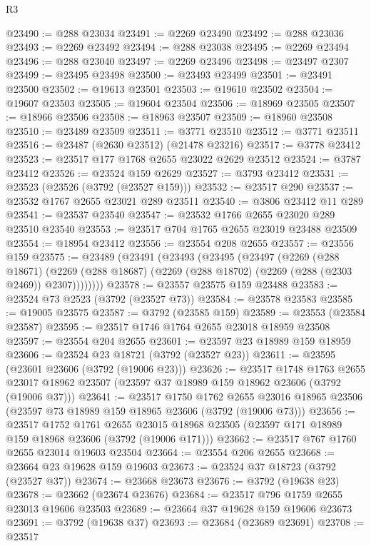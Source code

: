 \begin{lexlean}{R3}
\begin{coremodule}
@23490 := @288 @23034
@23491 := @2269 @23490
@23492 := @288 @23036
@23493 := @2269 @23492
@23494 := @288 @23038
@23495 := @2269 @23494
@23496 := @288 @23040
@23497 := @2269 @23496
@23498 := @23497 @2307
@23499 := @23495 @23498
@23500 := @23493 @23499
@23501 := @23491 @23500
@23502 := @19613 @23501
@23503 := @19610 @23502
@23504 := @19607 @23503
@23505 := @19604 @23504
@23506 := @18969 @23505
@23507 := @18966 @23506
@23508 := @18963 @23507
@23509 := @18960 @23508
@23510 := @23489 @23509
@23511 := @3771 @23510
@23512 := @3771 @23511
@23516 := @23487 (@2630 @23512) (@21478 @23216)
@23517 := @3778 @23412
@23523 := @23517 @177 @1768 @2655 @23022 @2629 @23512
@23524 := @3787 @23412
@23526 := @23524 @159 @2629
@23527 := @3793 @23412
@23531 := @23523 (@23526 (@3792 (@23527 @159)))
@23532 := @23517 @290
@23537 := @23532 @1767 @2655 @23021 @289 @23511
@23540 := @3806 @23412 @11 @289
@23541 := @23537 @23540
@23547 := @23532 @1766 @2655 @23020 @289 @23510 @23540
@23553 := @23517 @704 @1765 @2655 @23019 @23488 @23509
@23554 := @18954 @23412
@23556 := @23554 @208 @2655
@23557 := @23556 @159
@23575 := @23489
    (@23491
      (@23493
        (@23495
          (@23497
            (@2269
              (@288 @18671)
              (@2269 (@288 @18687) (@2269 (@288 @18702) (@2269 (@288 (@2303 @2469)) @2307))))))))
@23578 := @23557 @23575 @159 @23488
@23583 := @23524 @73 @2523 (@3792 (@23527 @73))
@23584 := @23578 @23583
@23585 := @19005 @23575
@23587 := @3792 (@23585 @159)
@23589 := @23553 (@23584 @23587)
@23595 := @23517 @1746 @1764 @2655 @23018 @18959 @23508
@23597 := @23554 @204 @2655
@23601 := @23597 @23 @18989 @159 @18959
@23606 := @23524 @23 @18721 (@3792 (@23527 @23))
@23611 := @23595 (@23601 @23606 (@3792 (@19006 @23)))
@23626 := @23517
    @1748
    @1763
    @2655
    @23017
    @18962
    @23507
    (@23597 @37 @18989 @159 @18962 @23606 (@3792 (@19006 @37)))
@23641 := @23517
    @1750
    @1762
    @2655
    @23016
    @18965
    @23506
    (@23597 @73 @18989 @159 @18965 @23606 (@3792 (@19006 @73)))
@23656 := @23517
    @1752
    @1761
    @2655
    @23015
    @18968
    @23505
    (@23597 @171 @18989 @159 @18968 @23606 (@3792 (@19006 @171)))
@23662 := @23517 @767 @1760 @2655 @23014 @19603 @23504
@23664 := @23554 @206 @2655
@23668 := @23664 @23 @19628 @159 @19603
@23673 := @23524 @37 @18723 (@3792 (@23527 @37))
@23674 := @23668 @23673
@23676 := @3792 (@19638 @23)
@23678 := @23662 (@23674 @23676)
@23684 := @23517 @796 @1759 @2655 @23013 @19606 @23503
@23689 := @23664 @37 @19628 @159 @19606 @23673
@23691 := @3792 (@19638 @37)
@23693 := @23684 (@23689 @23691)
@23708 := @23517

\end{coremodule}
\end{lexlean}

